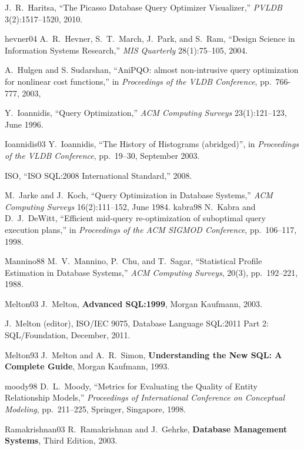 \documentclass[prodmode,acmtods]{acmsmall}
\begin{document}
\begin{thebibliography}{99}
J.~R.~Haritsa, ``The Picasso Database Query Optimizer Visualizer,'' {\em
  PVLDB} 3(2):1517--1520, 2010.

\bibitem
{hevner04}
A.~R.~Hevner, S.~T.~March, J.~Park, and S.~Ram, ``Design Science in
Information Systems Research,'' {\em MIS Quarterly} 28(1):75--105, 2004.

A.~Hulgen and S. Sudarshan, ``AniPQO: almost non-intrusive query optimization
for nonlinear cost functions,'' in {\em Proceedings of the VLDB Conference},
pp.~766-777, 2003,

Y.~Ioannidis, ``Query Optimization,'' {\em ACM Computing Surveys}
23(1):121--123, June 1996.

\bibitem
{Ioannidis03}
Y.~Ioannidis, ``The History of Histograms (abridged)'', in {\em Proceedings
  of the VLDB Conference}, pp.~19--30, September 2003.

ISO, ``ISO SQL:2008 International Standard,'' 2008.

M.~Jarke and J.~Koch, ``Query Optimization in Database Systems,'' {\em ACM
  Computing Surveys} 16(2):111--152, June 1984.
\bibitem
{kabra98}
N.~Kabra and D.~J.~DeWitt, ``Efficient mid-query re-optimization of
suboptimal query execution plans,'' in {\em Proceedings of the ACM SIGMOD Conference}, pp.~106--117, 1998.

\bibitem
{Mannino88}
M.~V.~Mannino, P.~Chu, and T.~Sagar, ``Statistical Profile Estimation in
Database Systems,'' {\em ACM Computing Surveys}, 20(3), pp.~192--221, 1988.

\bibitem
{Melton03}
J.~Melton, {\bf Advanced SQL:1999}, Morgan Kaufmann, 2003.

J.~Melton (editor), ISO/IEC 9075, Database Language SQL:2011 Part 2:
SQL/Foundation, December, 2011.

\bibitem
{Melton93}
J.~Melton and A.~R.~Simon, {\bf Understanding the New SQL: A Complete
  Guide}, Morgan Kaufmann, 1993.

\bibitem
{moody98} D.~L.~Moody, ``Metrics for Evaluating the Quality of Entity
Relationship Models,'' {\em Proceedings of International Conference on
  Conceptual Modeling}, pp.~211--225, Springer, Singapore, 1998.

\bibitem
{Ramakrishnan03}
R.~Ramakrishnan and J.~Gehrke, {\bf Database Management Systems}, Third
Edition, 2003.


\end{thebibliography}
\end{document}
